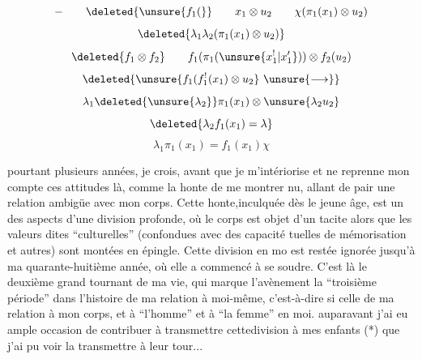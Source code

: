 \[
 -\qquad \deleted{\unsure{f_1(}}\qquad x_1\otimes u_2\qquad
 \chi(\pi_1(x_1)\otimes u_2)
\]
\[
 \deleted{\lambda_1\lambda_2(\pi_1(x_1)\otimes u_2)}
\]
\[
 \deleted{f_1\otimes f_2}\qquad f_1(\pi_1(\unsure{x^!_1|x'_1}))\otimes f_2(u_2)
\]
\[
 \deleted{\unsure{f_1(f^!_1(x_1)\otimes u_2}\ \unsure{\longrightarrow}}
\]
\[
 \lambda_1\deleted{\unsure{\lambda_2}}\pi_1(x_1)\otimes\unsure{\lambda_2u_2}
\]
\[
 \deleted{\lambda_2f_1(x_1)=\lambda}
\]
\[
 \lambda_1\pi_1(x_1)=f_1(x_1)\chi
\]


pourtant plusieurs années, je crois, avant que je m'intériorise et ne reprenne  mon compte ces attitudes là, comme la honte de me montrer nu, allant de pair  une relation ambigüe avec mon corps. Cette honte,inculquée dès le jeune âge, est un des aspects d'une division profonde, où le corps est objet d'un tacite  alors que les valeurs dites ``culturelles'' (confondues avec des capacité \newline tuelles de mémorisation et autres) sont montées en épingle. Cette division en mo est restée ignorée jusqu'à ma quarante-huitième année, où elle a commencé à se \inserted{-}\newline soudre. C'est là le deuxième grand tournant de ma vie, qui marque l'avènement  la ``troisième période'' dans l'histoire de ma relation à moi-même, c'est-à-dire \newline si celle de ma relation à mon corps, et à ``l'homme'' et à ``la femme'' en moi.  auparavant j'ai eu ample occasion de contribuer à transmettre cette\unsure{-| }division à mes enfants (*)\inserted{,} que j'ai pu voir la transmettre à leur tour...

